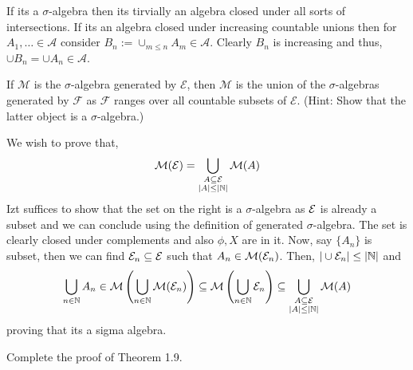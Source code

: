 \documentclass[12pt,a4paper]{article}
\begin{document}
\begin{solution}
    If its a $\sigma$-algebra then its tirvially an algebra closed under all sorts of intersections. 
    If its an algebra closed under increasing countable unions then for $A_1,\ldots\in\mathcal A$ consider $B_n:=\cup_{m\leq n}A_m\in\mathcal A$. 
    Clearly $B_n$ is increasing and thus, $\cup B_n=\cup A_n\in\mathcal A.$
\end{solution}
\begin{problem}\label{prob:1-5}
If $\mathcal{M}$ is the $\sigma$-algebra generated by $\mathcal{E}$, then $\mathcal{M}$ is the union of the $\sigma$-algebras generated by $\mathcal{F}$ as $\mathcal{F}$ ranges over all countable subsets of $\mathcal{E}$. (Hint: Show that the latter object is a $\sigma$-algebra.)
\end{problem}
\begin{solution}
    We wish to prove that,
    $$\mathcal{M}(\mathcal{E})=\bigcup_{\substack{A\subseteq\mathcal{E}\\ |A|\leq|\mathbb{N}|}}\mathcal{M}(A)$$
    Izt suffices to show that the set on the right is a $\sigma$-algebra as $\mathcal{E}$ is already a subset and we can conclude using the definition of generated $\sigma$-algebra. 
    The set is clearly closed under complements and also $\phi,X$ are in it. 
    Now, say $\{A_n\}$ is subset, then we can find $\mathcal{E}_n\subseteq\mathcal{E}$ such that $A_n\in\mathcal{M}(\mathcal{E}_n)$. 
    Then, $|\cup\mathcal{E}_n|\leq|\mathbb{N}|$ and
    $$\bigcup_{n\in\mathbb{N}}A_n\in\mathcal{M}\left(\bigcup_{n\in\mathbb{N}}\mathcal{M}(\mathcal{E}_n)\right)\subseteq\mathcal{M}\left(\bigcup_{n\in\mathbb{N}}\mathcal{E}_n\right)\subseteq\bigcup_{\substack{A\subseteq\mathcal{E}\\ |A|\leq|\mathbb{N}|}}\mathcal{M}(A)$$
    proving that its a sigma algebra.
\end{solution}
\begin{problem}\label{prob:1-6}
Complete the proof of Theorem 1.9.
\end{problem}
\end{document}
